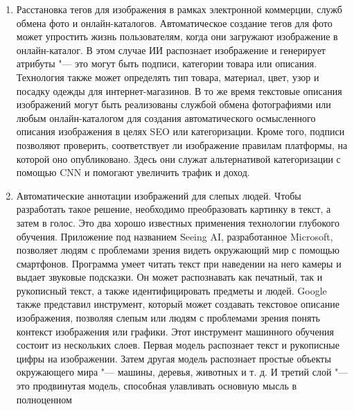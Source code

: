 \documentclass[bachelor, och, coursework]{SCWorks}
\begin{document}
        \begin{enumerate}
            \item 
                Расстановка тегов для изображения в рамках электронной
                коммерции, служб обмена фото и онлайн-каталогов. Автоматическое
                создание тегов для фото может упростить жизнь пользователям,
                когда они загружают изображение в онлайн-каталог. В этом случае
                ИИ распознает изображение и генерирует атрибуты "--- это могут
                быть подписи, категории товара или описания. Технология также
                может определять тип товара, материал, цвет, узор и посадку
                одежды для интернет-магазинов. В то же время текстовые описания
                изображений могут быть реализованы службой обмена фотографиями
                или любым онлайн-каталогом для создания автоматического
                осмысленного описания изображения в целях SEO или категоризации.
                Кроме того, подписи позволяют проверить, соответствует ли
                изображение правилам платформы, на которой оно опубликовано.
                Здесь они служат альтернативой категоризации с помощью CNN и
                помогают увеличить трафик и доход.
            \item
                Автоматические аннотации изображений для слепых людей. Чтобы
                разработать такое решение, необходимо преобразовать картинку в
                текст, а затем в голос. Это два хорошо известных применения
                технологии глубокого обучения. Приложение под названием Seeing
                AI, разработанное Microsoft, позволяет людям с проблемами зрения
                видеть окружающий мир с помощью смартфонов. Программа умеет
                читать текст при наведении на него камеры и выдает звуковые
                подсказки. Он может распознавать как печатный, так и рукописный
                текст, а также идентифицировать предметы и людей. Google также
                представил инструмент, который может создавать текстовое
                описание изображения, позволяя слепым или людям с проблемами
                зрения понять контекст изображения или графики. Этот инструмент
                машинного обучения состоит из нескольких слоев. Первая модель
                распознает текст и рукописные цифры на изображении. Затем другая
                модель распознает простые объекты окружающего мира "--- машины,
                деревья, животных и т. д. И третий слой "--- это продвинутая
                модель, способная улавливать основную мысль в полноценном

\end{enumerate}
\end{document}
